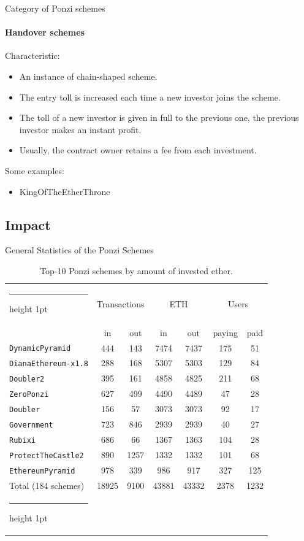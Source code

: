 \documentclass[aspectratio=169,10pt]{beamer}
\makeatletter
\newcommand{\thickhline}{%
    \noalign {\ifnum 0=`}\fi \hrule height 1pt
    \futurelet \reserved@a \@xhline
}
\makeatother
\begin{document}
\begin{frame}{Category of Ponzi schemes}
\framesubtitle{Handover schemes}

Characteristic:
\begin{itemize}
\item An instance of chain-shaped scheme.
\item The entry toll is increased each time a new investor joins the scheme.
\item The toll of a new investor is given in full to the previous one, the previous investor makes an instant profit.
\item Usually, the contract owner retains a fee from each investment.
\end{itemize} \bigskip

Some examples:
\begin{itemize}
\item KingOfTheEtherThrone
\end{itemize}

\end{frame}

\subsection{Impact}

\begin{frame}{General Statistics of the Ponzi Schemes}

\begin{table}
\begin{tabular}{l|cc|cc|cc}
\thickhline
\multirow{2}{*}{Contract name} & \multicolumn{2}{c|}{Transactions} & \multicolumn{2}{c|}{ETH}  & \multicolumn{2}{c}{Users} \\
 & in & out & in & out & paying & paid \\\hline
\texttt{DynamicPyramid}     & 444 & 143  & 7474 & 7437 & 175 & 51  \\
\texttt{DianaEthereum-x1.8} & 288 & 168  & 5307 & 5303 & 129 & 84  \\
\texttt{Doubler2}           & 395 & 161  & 4858 & 4825 & 211 & 68  \\
\texttt{ZeroPonzi}          & 627 & 499  & 4490 & 4489 & 47  & 28  \\
\texttt{Doubler}            & 156 & 57   & 3073 & 3073 & 92  & 17  \\
\texttt{Government}         & 723 & 846  & 2939 & 2939 & 40  & 27  \\
\texttt{Rubixi}             & 686 & 66   & 1367 & 1363 & 104 & 28  \\
\texttt{ProtectTheCastle2}  & 890 & 1257 & 1332 & 1332 & 101 & 68  \\
\texttt{EthereumPyramid}    & 978 & 339  & 986  & 917  & 327 & 125 \\\hline
Total (184 schemes) & 18925 & 9100 & 43881 & 43332 & 2378 & 1232   \\\thickhline
\end{tabular}
\caption{Top-10 Ponzi schemes by amount of invested ether.}
\end{table}

\end{frame}
\end{document}
